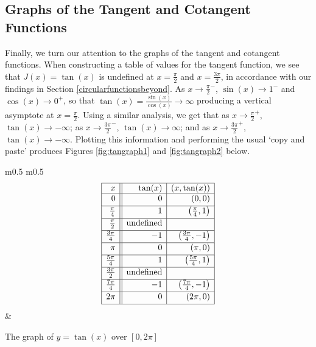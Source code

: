 \subsection{Graphs of the Tangent and Cotangent Functions}

Finally, we turn our attention to the graphs of the tangent and cotangent functions.  When constructing a table of values for the tangent function, we see that $J(x) = \tan(x)$ is undefined at $x  = \frac{\pi}{2}$ and $x = \frac{3\pi}{2}$, in accordance with our findings in Section \ref{circularfunctionsbeyond}.  As $x \rightarrow \frac{\pi}{2}^{-}$, $\sin(x) \rightarrow 1^{-}$ and $\cos(x) \rightarrow 0^{+}$, so that $\tan(x)  = \frac{\sin(x)}{\cos(x)}\rightarrow \infty$ producing a vertical asymptote at $x = \frac{\pi}{2}$.  Using a similar analysis, we get that as $x \rightarrow \frac{\pi}{2}^{+}$, $\tan(x) \rightarrow -\infty$; as $x \rightarrow \frac{3\pi}{2}^{-}$, $\tan(x) \rightarrow \infty$; and as $x \rightarrow \frac{3\pi}{2}^{+}$, $\tan(x) \rightarrow -\infty$.  Plotting this information and performing the usual `copy and paste' produces Figures \ref{fig:tangraph1} and \ref{fig:tangraph2} below. 

\medskip

\noindent\hskip-10pt\begin{minipage}{\textwidth}
\begin{center}
\begin{tabular}{ m{} m{}}
\setlength{\extrarowheight}{2pt}
\[ \begin{array}{|r||r|r|}  

\hline

 x & \tan(x) & (x,\tan(x)) \\ \hline
0  & 0 & (0, 0) \\ [2pt]   \hline
\frac{\pi}{4}  & 1 & \left(\frac{\pi}{4},1 \right) \\ [2pt] \hline 
\frac{\pi}{2}  & \text{undefined} &  \\ [2pt] \hline 
\frac{3\pi}{4}  & -1 & \left(\frac{3\pi}{4}, -1\right) \\ [2pt] \hline 
\pi & 0 & (\pi, 0) \\ [2pt] \hline 
\frac{5\pi}{4}  & 1 & \left(\frac{5\pi}{4}, 1 \right) \\ [2pt] \hline 
\frac{3\pi}{2}  & \text{undefined} &  \\ [2pt] \hline 
\frac{7\pi}{4}  & -1 & \left(\frac{7\pi}{4}, -1 \right) \\ [2pt] \hline 
2\pi  & 0 & (2\pi, 0) \\  [2pt] \hline
\end{array} \]  \setlength{\extrarowheight}{0pt} & 

\end{tabular}
\end{center}
\captionsetup{type=figure}
\caption{The graph of $y = \tan(x)$ over $[0,2\pi]$}\label{fig:tangraph1}
\end{minipage}



